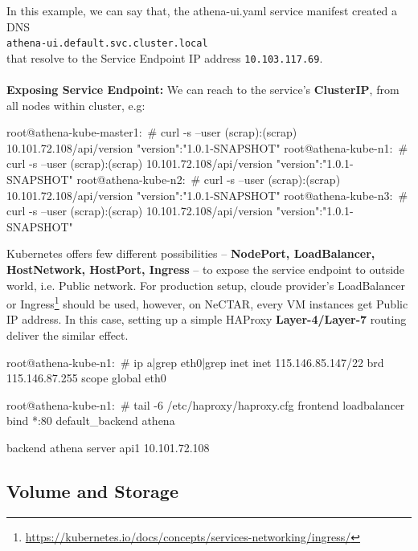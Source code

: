 \noindent In this example, we can say that, the athena-ui.yaml service manifest created a DNS
\\
\verb|athena-ui.default.svc.cluster.local|
\\
that resolve to the Service Endpoint IP address \verb|10.103.117.69|.
\\
\\
\noindent \textbf{Exposing Service Endpoint:} \quad We can reach to the service's \textbf{ClusterIP}, from all nodes within cluster, e.g:

\begin{small}
\begin{lcverbatim}
root@athena-kube-master1:~# curl -s --user (scrap):(scrap) 10.101.72.108/api/version
{"version":"1.0.1-SNAPSHOT"}
root@athena-kube-n1:~# curl -s --user (scrap):(scrap) 10.101.72.108/api/version
{"version":"1.0.1-SNAPSHOT"}
root@athena-kube-n2:~# curl -s --user (scrap):(scrap) 10.101.72.108/api/version
{"version":"1.0.1-SNAPSHOT"}
root@athena-kube-n3:~# curl -s --user (scrap):(scrap) 10.101.72.108/api/version
{"version":"1.0.1-SNAPSHOT"}
\end{lcverbatim}
\end{small}

\noindent Kubernetes offers few different possibilities -- \textbf{NodePort, LoadBalancer, HostNetwork, HostPort, Ingress} -- to expose the service endpoint to outside world, i.e. Public network. For production setup, cloude provider's LoadBalancer or Ingress\footnote{\url{https://kubernetes.io/docs/concepts/services-networking/ingress/}} should be used, however, on NeCTAR, every VM instances get Public IP address. In this case, setting up a simple HAProxy \textbf{Layer-4/Layer-7} routing deliver the similar effect.

\begin{small}
\begin{lcverbatim}
root@athena-kube-n1:~# ip a|grep eth0|grep inet
    inet 115.146.85.147/22 brd 115.146.87.255 scope global eth0

root@athena-kube-n1:~# tail -6 /etc/haproxy/haproxy.cfg
frontend loadbalancer
	bind *:80
	default_backend athena

backend athena
	server api1 10.101.72.108
\end{lcverbatim}
\end{small}

\subsection{Volume and Storage}

